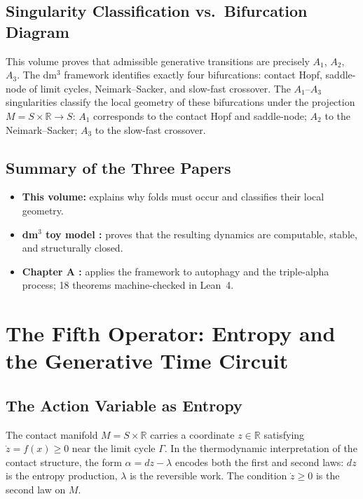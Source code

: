 \documentclass[12pt,a4paper]{article}
\begin{document}
\subsection{Singularity Classification vs.\ Bifurcation Diagram}

This volume proves that admissible generative transitions are precisely
$A_1$, $A_2$, $A_3$.
The dm$^3$ framework identifies exactly four bifurcations: contact
Hopf, saddle-node of limit cycles, Neimark--Sacker, and slow-fast
crossover.
The $A_1$--$A_3$ singularities classify the local geometry of these
bifurcations under the projection $M = S \times \mathbb{R} \to S$:
$A_1$ corresponds to the contact Hopf and saddle-node;
$A_2$ to the Neimark--Sacker;
$A_3$ to the slow-fast crossover.

\subsection{Summary of the Three Papers}

\begin{itemize}[leftmargin=2em]
  \item \textbf{This volume:} explains why folds must occur and
    classifies their local geometry.
  \item \textbf{dm$^3$ toy model \cite{Grossi2026_SIAM}:} proves that
    the resulting dynamics are computable, stable, and structurally
    closed.
  \item \textbf{Chapter A \cite{Grossi2026_ChA}:} applies the
    framework to autophagy and the triple-alpha process; 18 theorems
    machine-checked in Lean~4.
\end{itemize}

\section{The Fifth Operator: Entropy and the Generative Time Circuit}
\label{sec:entropy}

\subsection{The Action Variable as Entropy}

The contact manifold $M = S \times \mathbb{R}$ carries a coordinate
$z \in \mathbb{R}$ satisfying $\dot{z} = f(x) \geq 0$ near the limit
cycle $\Gamma$.
In the thermodynamic interpretation of the contact structure, the form
$\alpha = dz - \lambda$ encodes both the first and second laws: $dz$
is the entropy production, $\lambda$ is the reversible work.
The condition $\dot{z} \geq 0$ is the second law on $M$.
\end{document}
